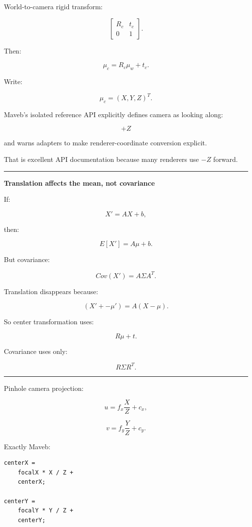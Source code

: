 World-to-camera rigid transform:

\[
\begin{bmatrix}
R_c&t_c\\
0&1
\end{bmatrix}.
\]

Then:

\[
\boxed{
\mu_c
=
R_c\mu_w+t_c.
}
\]

Write:

\[
\mu_c=
(X,Y,Z)^T.
\]

Maveb's isolated reference API explicitly defines camera as looking along:

\[
\boxed{+Z}
\]

and warns adapters to make renderer-coordinate conversion explicit.

That is excellent API documentation because many renderers use \(-Z\) forward.

\begin{center}\rule{0.5\linewidth}{0.5pt}\end{center}

\textbf{Translation affects the mean, not covariance}

If:

\[
X'=AX+b,
\]

then:

\[
E[X']
=
A\mu+b.
\]

But covariance:

\[
Cov(X')
=
A\Sigma A^T.
\]

Translation disappears because:

\[
(X'+-\mu')
=
A(X-\mu).
\]

So center transformation uses:

\[
R\mu+t.
\]

Covariance uses only:

\[
R\Sigma R^T.
\]

\begin{center}\rule{0.5\linewidth}{0.5pt}\end{center}

Pinhole camera projection:

\[
u=
f_x\frac{X}{Z}
+
c_x,
\]

\[
v=
f_y\frac{Y}{Z}
+
c_y.
\]

Exactly Maveb:

\begin{verbatim}
centerX =
    focalX * X / Z +
    centerX;

centerY =
    focalY * Y / Z +
    centerY;
\end{verbatim}

